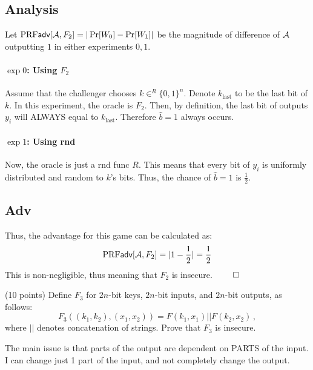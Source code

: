 \documentclass[12pt]{article}
\begin{document}
\begin{problem}
\begin{solution}
\subsection*{Analysis}
Let $\textrm{PRF}\textsf{adv}[\mathcal{A}, F_2] = |\Pr[W_0] - \Pr[W_1]|$ be the magnitude of difference of $\mathcal{A}$ outputting $1$ in either experiments $0, 1$.

\paragraph{$\exp 0$: Using $F_2$}
Assume that the challenger chooses $k \in^R \{0, 1\}^n$. Denote $k_{\text{last}}$ to be the last bit of $k$. In this experiment, the oracle is $F_2$. Then, by definition, the last bit of outputs $y_i$ will ALWAYS equal to $k_{\text{last}}$. Therefore $\hat{b} = 1$ always occurs.

\paragraph{$\exp 1$: Using rnd}
Now, the oracle is just a rnd func $R$. This means that every bit of $y_i$ is uniformly distributed and random to $k$'s bits. Thus, the chance of $\hat{b} = 1$ is $\frac{1}{2}$.

\subsection*{Adv}
Thus, the advantage for this game can be calculated as:
\begin{equation*}
  \textrm{PRF}\textsf{adv}[\mathcal{A}, F_2] = |1 - \frac{1}{2}| = \frac{1}{2}
\end{equation*}
This is non-negligible, thus meaning that $F_2$ is insecure. $\qed$
\end{solution}

\begin{ppart} (10 points)
Define $F_3$  for $2n$-bit keys, $2n$-bit inputs, and $2n$-bit outputs, as follows: 
\[
F_3((k_1, k_2), (x_1, x_2))=F(k_1, x_1)|| F(k_2, x_2)\,,
\]
where $||$ denotes concatenation of strings. Prove that $F_3$ is insecure.
\end{ppart}

\begin{solution}
  The main issue is that parts of the output are dependent on PARTS of the input. I can change just 1 part of the input, and not completely change the output.


\end{solution}
\end{problem}
\end{document}
